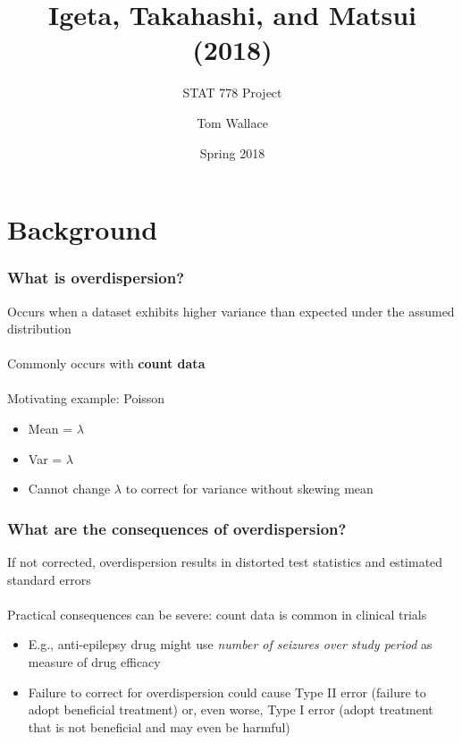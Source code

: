 \documentclass{beamer}
\title{Igeta, Takahashi, and Matsui (2018)}
\subtitle{STAT 778 Project}
\author{Tom Wallace}
\institute{George Mason University}
\date{Spring 2018}
\begin{document}
\frame{\titlepage}


\section{Background}
\begin{frame}
	\frametitle{What is overdispersion?}
	Occurs when a dataset exhibits higher variance than expected under the assumed
	distribution \\~\\

	     Commonly occurs with \textbf{count data} \\~\\

	     Motivating example: Poisson 
	     \begin{itemize}
		     \item \small Mean = $\lambda$
		     \item \small Var = $\lambda$
		     \item \small Cannot change $\lambda$ to correct for variance without skewing
			     mean
	     \end{itemize}
\end{frame}
\begin{frame}
	\frametitle{What are the consequences of overdispersion?}
	If not corrected, overdispersion results in distorted test statistics and estimated
	standard errors \\~\\

	Practical consequences can be severe: count data is common in clinical
	trials
	\begin{itemize}
		\item \small E.g., anti-epilepsy drug might use \textit{number
			of seizures over study period} as measure of drug
			efficacy 
		\item \small Failure to correct for overdispersion could cause
			Type II error (failure to adopt beneficial treatment)
			or, even worse, Type I error (adopt treatment that is
			not beneficial and may even be harmful)
	\end{itemize}
\end{frame}
\end{document}
